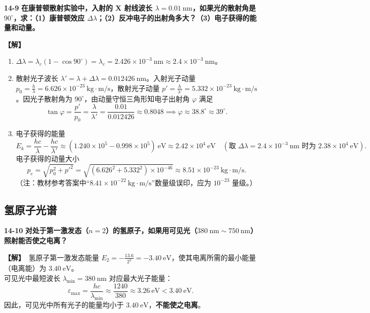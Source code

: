 \documentclass[zihao=5,a4paper,UTF8]{ctexart}
\newenvironment{prob}[2]{%
    \par\vspace{6pt}\noindent\textbf{\color{navy}#1} \textbf{#2}\par\nopagebreak\vspace{2pt}%
}{%
    \par\vspace{4pt}%
}
\newcommand{\sol}{\noindent\textbf{\color{tealaccent}【解】}\ }
\begin{document}
\begin{prob}{14-9}{在康普顿散射实验中，入射的 X 射线波长 $\lambda=0.01\ \mathrm{nm}$，如果光的散射角是 $90^\circ$，求：（1）康普顿效应 $\Delta\lambda$；（2）反冲电子的出射角多大？（3）电子获得的能量和动量。}
\sol
\begin{enumerate}[leftmargin=2em, itemsep=2pt]
    \item $\Delta\lambda = \lambda_c(1 - \cos 90^\circ) = \lambda_c = 2.426\times 10^{-3}\ \mathrm{nm} \approx 2.4\times 10^{-3}\ \mathrm{nm}$。
    \item 散射光子波长 $\lambda' = \lambda + \Delta\lambda = 0.012426\ \mathrm{nm}$。入射光子动量 $p_0 = \frac{h}{\lambda} = 6.626\times 10^{-23}\ \mathrm{kg\cdot m/s}$，散射光子动量 $p' = \frac{h}{\lambda'} = 5.332\times 10^{-23}\ \mathrm{kg\cdot m/s}$。因光子散射角为 $90^\circ$，由动量守恒三角形知电子出射角 $\varphi$ 满足
    \[
        \tan\varphi = \frac{p'}{p_0} = \frac{\lambda}{\lambda'} = \frac{0.01}{0.012426} \approx 0.8048 \implies \varphi \approx 38.8^\circ \approx 39^\circ.
    \]
    \item 电子获得的能量
    \[
        E_k = \frac{hc}{\lambda} - \frac{hc}{\lambda'} \approx (1.240\times 10^5 - 0.998\times 10^5)\ \mathrm{eV} \approx 2.42\times 10^4\ \mathrm{eV}\quad (\text{取 }\Delta\lambda=2.4\times 10^{-3}\ \mathrm{nm}\text{ 时为 } 2.38\times 10^4\ \mathrm{eV}).
    \]
    电子获得的动量大小
    \[
        p_e = \sqrt{p_0^2 + p'^2} = \sqrt{(6.626^2 + 5.332^2)\times 10^{-46}} \approx 8.51\times 10^{-23}\ \mathrm{kg\cdot m/s}.
    \]
    （注：教材参考答案中“$8.41\times 10^{-22}\ \mathrm{kg\cdot m/s}$”数量级误印，应为 $10^{-23}$ 量级。）
\end{enumerate}
\end{prob}

\subsection{氢原子光谱}

\begin{prob}{14-10}{对处于第一激发态（$n=2$）的氢原子，如果用可见光（$380\ \mathrm{nm}\sim 750\ \mathrm{nm}$）照射能否使之电离？}
\sol 氢原子第一激发态能量 $E_2 = -\frac{13.6}{2^2} = -3.40\ \mathrm{eV}$，使其电离所需的最小能量（电离能）为 $3.40\ \mathrm{eV}$。\\
可见光中最短波长 $\lambda_{\min} = 380\ \mathrm{nm}$ 对应最大光子能量：
\[
    \varepsilon_{\max} = \frac{hc}{\lambda_{\min}} \approx \frac{1240}{380} \approx 3.26\ \mathrm{eV} < 3.40\ \mathrm{eV}.
\]
因此，可见光中所有光子的能量均小于 $3.40\ \mathrm{eV}$，\textbf{不能使之电离}。
\end{prob}
\end{document}
